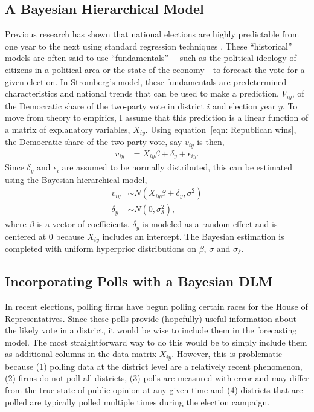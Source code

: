 \documentclass[12pt,final,fleqn]{article}
\theoremstyle{plain}
\begin{document}
\subsection{A Bayesian Hierarchical Model}
Previous research has shown that national elections are highly predictable from one year to the next using standard regression techniques \citep[e.g.][]{campbell1992forecasting, gelman1993american, kastellec2008predicting}. These ``historical'' models are often said to use ``fundamentals''--- such as the political ideology of citizens in a political area or the state of the economy---to forecast the vote for a given election. In Stromberg's model, these fundamentals are predetermined characteristics and national trends that can be used to make a prediction, $V_{iy}$, of the Democratic share of the two-party vote in district $i$ and election year $y$. To move from theory to empirics, I assume that this prediction is a linear function of a matrix of explanatory variables, $X_{iy}$. Using equation~\ref{eqn: Republican wins}, the Democratic share of the two party vote, say $v_{iy}$ is then,
\begin{align}
v_{iy}&= X_{iy}\beta + \delta_y + \epsilon_{iy}.
\end{align}
Since $\delta_y$ and $\epsilon_i$ are assumed to be normally distributed, this can be estimated using the Bayesian hierarchical model,
\begin{align}
v_{iy} &\sim N\left(X_{iy}\beta + \delta_y,  \sigma^2\right) \label{eqn: hierarchical linear model} \\
\delta_y &\sim N(0, \sigma^2_\delta), \label{eqn: hierarchical linear model time effects}
\end{align}
where $\beta$ is a vector of coefficients. $\delta_y$ is modeled as a random effect and is centered at 0 because $X_{iy}$ includes an intercept. The Bayesian estimation is completed  with uniform hyperprior distributions on $\beta$, $\sigma$ and $\sigma_\delta$.

\subsection{Incorporating Polls with a Bayesian DLM}
In recent elections, polling firms have begun polling certain races for the House of Representatives. Since these polls provide (hopefully) useful information about the likely vote in a district, it would be wise to include them in the forecasting model. The most straightforward way to do this would be to simply include them as additional columns in the data matrix $X_{iy}$. However, this is problematic because (1) polling data at the district level are a relatively recent phenomenon, (2) firms do not poll all districts, (3) polls are measured with error and may differ from the true state of public opinion at any given time and (4) districts that are polled are typically polled multiple times during the election campaign.
\end{document}
